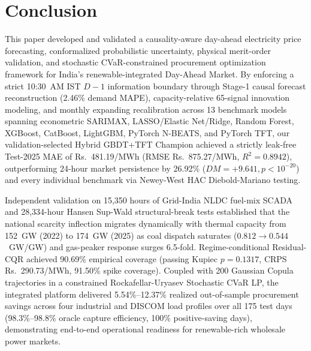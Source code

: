 \documentclass[runningheads,a4paper]{llncs}
\begin{document}
\section{Conclusion}
This paper developed and validated a causality-aware day-ahead electricity price forecasting, conformalized probabilistic uncertainty, physical merit-order validation, and stochastic CVaR-constrained procurement optimization framework for India's renewable-integrated Day-Ahead Market. By enforcing a strict 10:30~AM IST $D-1$ information boundary through Stage-1 causal forecast reconstruction (2.46\% demand MAPE), capacity-relative 65-signal innovation modeling, and monthly expanding recalibration across 13 benchmark models spanning econometric SARIMAX, LASSO/Elastic Net/Ridge, Random Forest, XGBoost, CatBoost, LightGBM, PyTorch N-BEATS, and PyTorch TFT, our validation-selected Hybrid GBDT+TFT Champion achieved a strictly leak-free Test-2025 MAE of Rs.~481.19/MWh (RMSE Rs.~875.27/MWh, $R^2 = 0.8942$), outperforming 24-hour market persistence by 26.92\% ($DM = +9.641, p < 10^{-20}$) and every individual benchmark via Newey-West HAC Diebold-Mariano testing.

Independent validation on 15,350 hours of Grid-India NLDC fuel-mix SCADA and 28,334-hour Hansen Sup-Wald structural-break tests established that the national scarcity inflection migrates dynamically with thermal capacity from 152~GW (2022) to 174~GW (2025) as coal dispatch saturates ($0.812 \to 0.544$~GW/GW) and gas-peaker response surges 6.5-fold. Regime-conditional Residual-CQR achieved 90.69\% empirical coverage (passing Kupiec $p = 0.1317$, CRPS Rs.~290.73/MWh, 91.50\% spike coverage). Coupled with 200 Gaussian Copula trajectories in a constrained Rockafellar-Uryasev Stochastic CVaR LP, the integrated platform delivered 5.54\%--12.37\% realized out-of-sample procurement savings across four industrial and DISCOM load profiles over all 175 test days (98.3\%--98.8\% oracle capture efficiency, 100\% positive-saving days), demonstrating end-to-end operational readiness for renewable-rich wholesale power markets.




\end{document}
